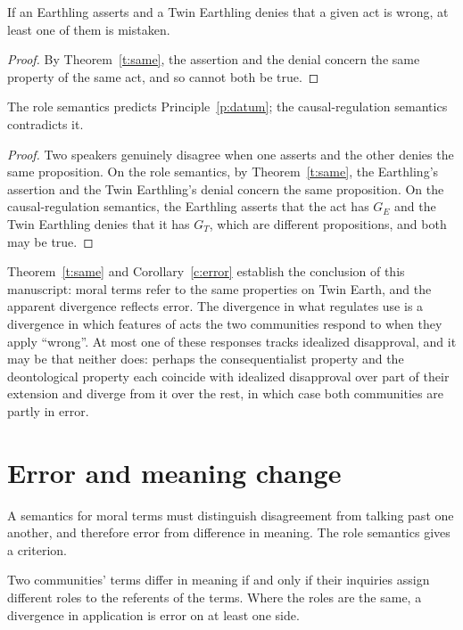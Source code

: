 \documentclass{situationist-preprint}
\begin{document}
\begin{corollary}\label{c:error}
If an Earthling asserts and a Twin Earthling denies that a given act is wrong, at least one of them is mistaken.
\end{corollary}

\begin{proof}
By Theorem~\ref{t:same}, the assertion and the denial concern the same property of the same act, and so cannot both be true.
\end{proof}

\begin{proposition}\label{p:explains}
The role semantics predicts Principle~\ref{p:datum}; the causal-regulation semantics contradicts it.
\end{proposition}

\begin{proof}
Two speakers genuinely disagree when one asserts and the other denies the same proposition. On the role semantics, by Theorem~\ref{t:same}, the Earthling's assertion and the Twin Earthling's denial concern the same proposition. On the causal-regulation semantics, the Earthling asserts that the act has $G_E$ and the Twin Earthling denies that it has $G_T$, which are different propositions, and both may be true.
\end{proof}

Theorem~\ref{t:same} and Corollary~\ref{c:error} establish the conclusion of this manuscript: moral terms refer to the same properties on Twin Earth, and the apparent divergence reflects error. The divergence in what regulates use is a divergence in which features of acts the two communities respond to when they apply \enquote{wrong}. At most one of these responses tracks idealized disapproval, and it may be that neither does: perhaps the consequentialist property and the deontological property each coincide with idealized disapproval over part of their extension and diverge from it over the rest, in which case both communities are partly in error.

\section{Error and meaning change}\label{s:cases}

A semantics for moral terms must distinguish disagreement from talking past one another, and therefore error from difference in meaning. The role semantics gives a criterion.

\begin{proposition}[Criterion]\label{p:crit}
Two communities' terms differ in meaning if and only if their inquiries assign different roles to the referents of the terms. Where the roles are the same, a divergence in application is error on at least one side.
\end{proposition}
\end{document}

